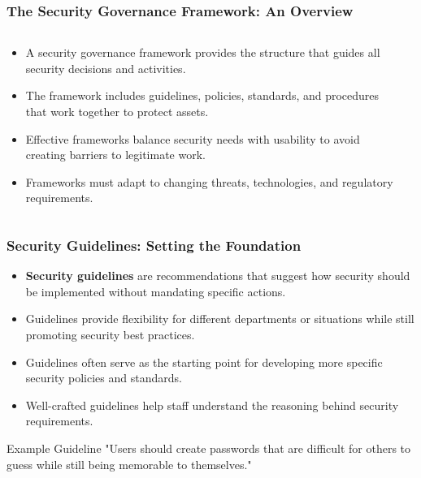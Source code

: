 \documentclass{beamer}
\begin{document}
\begin{frame}
\frametitle{The Security Governance Framework: An Overview}
\begin{columns}
\begin{column}{0.6\textwidth}
\begin{itemize}
\item A security governance framework provides the structure that guides all security decisions and activities.
\item The framework includes guidelines, policies, standards, and procedures that work together to protect assets.
\item Effective frameworks balance security needs with usability to avoid creating barriers to legitimate work.
\item Frameworks must adapt to changing threats, technologies, and regulatory requirements.
\end{itemize}
\end{column}
\begin{column}{0.4\textwidth}
\end{column}
\end{columns}
\end{frame}

\begin{frame}
\frametitle{Security Guidelines: Setting the Foundation}
\begin{itemize}
\item \textbf{Security guidelines} are recommendations that suggest how security should be implemented without mandating specific actions.
\item Guidelines provide flexibility for different departments or situations while still promoting security best practices.
\item Guidelines often serve as the starting point for developing more specific security policies and standards.
\item Well-crafted guidelines help staff understand the reasoning behind security requirements.
\end{itemize}

\begin{exampleblock}{Example Guideline}
"Users should create passwords that are difficult for others to guess while still being memorable to themselves."
\end{exampleblock}
\end{frame}
\end{document}
